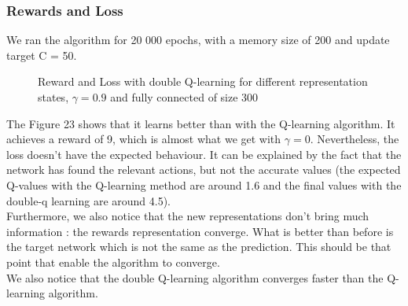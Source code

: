 \documentclass[a4paper]{article}
\begin{document}
    \subsubsection{Rewards and Loss}
    We ran the algorithm for 20 000 epochs, with a memory size of 200 and update target C = 50. 
    \begin{figure}[h!]
        \centering
        \qquad
        \caption{Reward and Loss with double Q-learning for different representation states, $\gamma = 0.9$ and fully connected of size 300 }%
        \label{fig:example}%
        \end{figure}
    
    The Figure 23 shows that it learns better than with the Q-learning algorithm. It achieves a reward of 9, which is almost what we get with $\gamma = 0$. Nevertheless, the loss doesn't have the expected behaviour. It can be explained by the fact that the network has found the relevant actions, but not the accurate values (the expected Q-values with the Q-learning method are around 1.6 and the final values with the double-q learning are around 4.5). \\
    Furthermore, we also notice that the new representations don't bring much information : the rewards representation converge. What is better than before is the target network which is not the same as the prediction. This should be that point that enable the algorithm to converge. \\
    We also notice that the double Q-learning algorithm converges faster than the Q-learning algorithm. 
    
\end{document}
